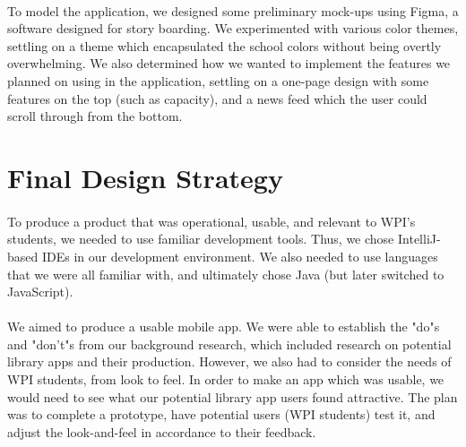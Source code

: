         \paragraph{}
        To model the application, we designed some preliminary mock-ups using Figma, a software designed for story boarding. We experimented with various color themes, settling on a theme which encapsulated the school colors without being overtly overwhelming. We also determined how we wanted to implement the features we planned on using in the application, settling on a one-page design with some features on the top (such as capacity), and a news feed which the user could scroll through from the bottom. 
    \newpage

   
 
    \section{Final Design Strategy}
    
    \paragraph{}
    To produce a product that was operational, usable, and relevant to WPI's students, we needed to use familiar development tools. Thus, we chose IntelliJ-based IDEs in our development environment. We also needed to use languages that we were all familiar with, and ultimately chose Java (but later switched to JavaScript).
    \paragraph{}
    We aimed to produce a usable mobile app. We were able to establish the "do"s and "don't"s from our background research, which included research on potential library apps and their production. However, we also had to consider the needs of WPI students, from look to feel. In order to make an app which was usable, we would need to see what our potential library app users found attractive. The plan was to complete a prototype, have potential users (WPI students) test it, and adjust the look-and-feel in accordance to their feedback.
